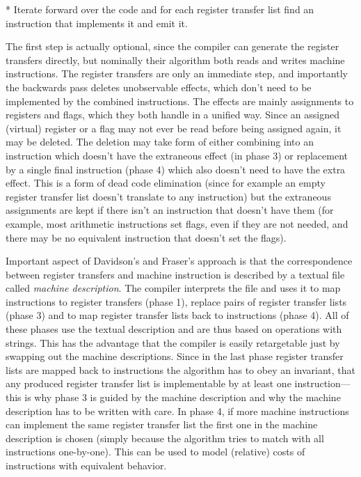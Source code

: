 * Iterate forward over the code and for each register transfer list find an
instruction that implements it and emit it.
\enditems

The first step is actually optional, since the compiler can generate the
register transfers directly, but nominally their algorithm both reads and writes
machine instructions. The register transfers are only an immediate step, and
importantly the backwards pass deletes unobservable effects, which don't need to
be implemented by the combined instructions. The effects are mainly assignments
to registers and flags, which they both handle in a unified way. Since an
assigned (virtual) register or a flag may not ever be read before being assigned
again, it may be deleted. The deletion may take form of either combining into an
instruction which doesn't have the extraneous effect (in phase 3) or replacement
by a single final instruction (phase 4) which also doesn't need to have the
extra effect. This is a form of dead code elimination (since for example an
empty register transfer list doesn't translate to any instruction) but the
extraneous assignments are kept if there isn't an instruction that doesn't have
them (for example, most arithmetic instructions set flags, even if they are not
needed, and there may be no equivalent instruction that doesn't set the flags).

Important aspect of Davidson's and Fraser's approach is that the correspondence
between register transfers and machine instruction is described by a textual
file called {\em machine description}. The compiler interprets the file and uses
it to map instructions to register transfers (phase 1), replace pairs of
register transfer lists (phase 3) and to map register transfer lists back to
instructions (phase 4). All of these phases use the textual description and are
thus based on operations with strings. This has the advantage that the compiler
is easily retargetable just by swapping out the machine descriptions. Since in
the last phase register transfer lists are mapped back to instructions the
algorithm has to obey an invariant, that any produced register transfer list is
implementable by at least one instruction---this is why phase 3 is guided by the
machine description and why the machine description has to be written with care.
In phase 4, if more machine instructions can implement the same register
transfer list the first one in the machine description is chosen (simply because
the algorithm tries to match with all instructions one-by-one). This can be used
to model (relative) costs of instructions with equivalent behavior.

